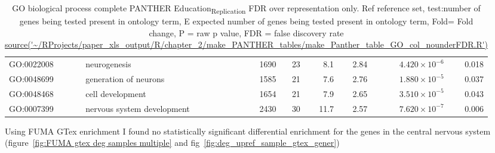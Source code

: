 \begin{table}[ht]
\begin{tabular}{llrrrrrr}
  GO:0022008 & neurogenesis  & 1690 & 23 & 8.1 & 2.84 & $4.420 \times 10^{-6}$ & 0.018 \\ 
  GO:0048699 & generation of neurons  & 1585 & 21 & 7.6 & 2.76 & $1.880 \times 10^{-5}$ & 0.037 \\ 
  GO:0048468 & cell development  & 1654 & 21 & 7.9 & 2.65 & $3.510 \times 10^{-5}$ & 0.043 \\ 
  GO:0007399 & nervous system development  & 2430 & 30 & 11.7 & 2.57 & $7.620 \times 10^{-7}$ & 0.006 \\ 
   \hline
\end{tabular}
\caption{GO biological process complete PANTHER Education\textsubscript{Replication} FDR over representation only. Ref reference set, test:number of genes being tested present in ontology term, E expected number of genes being tested present in ontology term, Fold= Fold change, P = raw p value, FDR = false discovery rate \url{source('~/RProjects/paper_xls_output/R/chapter_2/make_PANTHER_tables/make_Panther_table_GO_col_nounderFDR.R')}} 
\label{tab:GO biological process complete Education Replication FDRover represenation only}
\end{table}


Using FUMA GTex enrichment I found no statistically significant differential enrichment for the genes in the central nervous system (figure~\ref{fig:FUMA gtex deg samples multiple} and fig~\ref{fig:deg_upref_sample_gtex_gener})



    



